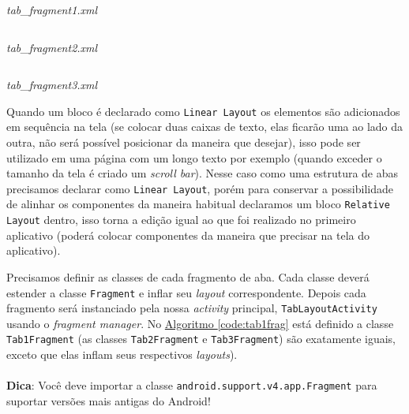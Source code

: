 \documentclass[a4paper,12pt,brazil,oneside]{book}
\begin{document}
	\begin{listing}[H]
	\inputminted[linenos=true,fontsize=\small,frame=lines, framesep=2mm, tabsize=2,numbersep=5pt]{xml}{src/design/tab-fragment.xml}
	\caption{\emph{tab\_fragment1.xml}}
	\end{listing}
	
	\begin{listing}[H]
	\inputminted[linenos=true,fontsize=\small,frame=lines, framesep=2mm, tabsize=2,numbersep=5pt]{xml}{src/design/tab-fragment2.xml}
	\caption{\emph{tab\_fragment2.xml}}
	\end{listing}
		
	\begin{listing}[H]
	\inputminted[linenos=true,fontsize=\small,frame=lines, framesep=2mm, tabsize=2,numbersep=5pt]{xml}{src/design/tab-fragment3.xml}
	\caption{\emph{tab\_fragment3.xml}}
	\end{listing}
	
	Quando um bloco é declarado como \texttt{Linear Layout} os elementos são adicionados em sequência na tela (se colocar duas caixas de texto, elas ficarão uma ao lado da outra, não será possível posicionar da maneira que desejar), isso pode ser utilizado em uma página com um longo texto por exemplo (quando exceder o tamanho da tela é criado um \emph{scroll bar}). Nesse caso como uma estrutura de abas precisamos declarar como \texttt{Linear Layout}, porém para conservar a possibilidade de alinhar os componentes da maneira habitual declaramos um bloco \texttt{Relative Layout} dentro, isso torna a edição igual ao que foi realizado no primeiro aplicativo (poderá colocar componentes da maneira que precisar na tela do aplicativo).
	
	Precisamos definir as classes de cada fragmento de aba. Cada classe deverá estender a classe \texttt{Fragment} e inflar seu \emph{layout} correspondente. Depois cada fragmento será instanciado pela nossa \emph{activity} principal, \texttt{TabLayoutActivity} usando o \emph{fragment manager}. No \hyperref[code:tab1frag]{Algoritmo \ref*{code:tab1frag}} está definido a classe \texttt{Tab1Fragment} (as classes \texttt{Tab2Fragment} e \texttt{Tab3Fragment}) são exatamente iguais, exceto que elas inflam seus respectivos \emph{layouts}).
		
	\begin{framed}
	\paragraph{}\textbf{Dica}: Você deve importar a classe \texttt{android.support.v4.app.Fragment} para suportar versões mais antigas do Android!
	\textit{}
	\end{framed}
\end{document}
